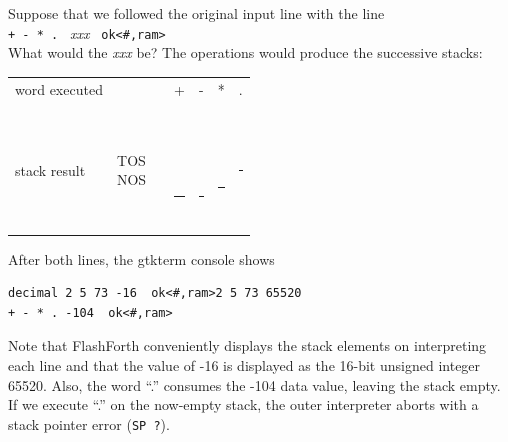 \documentclass[12pt,a4paper]{article}
\begin{document}
\medskip
Suppose that we followed the original input line with the line \vspace{7pt} \\
\verb!+ - * . ! \fbox{$\hookleftarrow$} \textit{xxx} \verb! ok<#,ram>! \vspace{7pt} \\
What would the \textit{xxx} be?
The operations would produce the successive stacks:
\begin{center}
 \begin{tabular}{lc|ccccc}
 word executed & & & + & - & * & . \\
 \\
 stack result  
 & \parbox[t]{35pt}{TOS \\ NOS} 
 & \parbox[t]{30pt}{ \\  \\  \\  \\ \rule{30pt}{2pt}} 
 & \parbox[t]{30pt}{ \  \\  \\ \rule{30pt}{2pt}}
 & \parbox[t]{30pt}{ \\  \\ \rule{30pt}{2pt}}
 & \parbox[t]{30pt}{ \\ \rule{30pt}{2pt}}
 & \parbox[t]{30pt}{\rule{30pt}{2pt}} \\
 \end{tabular}

\end{center}
After both lines, the gtkterm console shows
\begin{verbatim}
decimal 2 5 73 -16  ok<#,ram>2 5 73 65520 
+ - * . -104  ok<#,ram>
\end{verbatim}
Note that FlashForth conveniently displays the stack elements on interpreting each line 
and that the value of -16 is displayed as the 16-bit unsigned integer 65520.
Also, the word ``.'' consumes the -104 data value, leaving the stack empty.
If we execute ``.'' on the now-empty stack, the outer interpreter aborts with
a stack pointer error (\verb!SP ?!).
\end{document}
